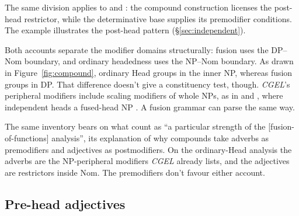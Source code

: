 \documentclass[12pt]{article}
\begin{document}
The same division applies to  and : the compound construction licenses the post-head restrictor, while the determinative base supplies its premodifier conditions. The example  illustrates the post-head pattern (§\ref{sec:independent}).

Both accounts separate the modifier domains structurally: fusion uses the DP--Nom boundary, and ordinary headedness uses the NP--Nom boundary. As drawn in Figure~\ref{fig:compound}, ordinary Head groups  in the inner NP, whereas fusion groups  in DP. That difference doesn't give a constituency test, though. \textit{CGEL}'s peripheral modifiers include scaling modifiers of whole NPs, as in  and  \citep[437]{huddleston2002}, where independent  heads a fused-head NP \citep[422]{huddleston2002}. A fusion grammar can parse  the same way.

The same inventory bears on what \textcite[583]{Payne2007} count as \enquote{a particular strength of the [fusion-of-functions] analysis}, its explanation of why compounds take adverbs as premodifiers and adjectives as postmodifiers. On the ordinary-Head analysis the adverbs are the NP-peripheral modifiers \textit{CGEL} already lists, and the adjectives are restrictors inside Nom. The premodifiers don't favour either account.

\subsection{Pre-head adjectives}\label{sec:prehead}
\end{document}
